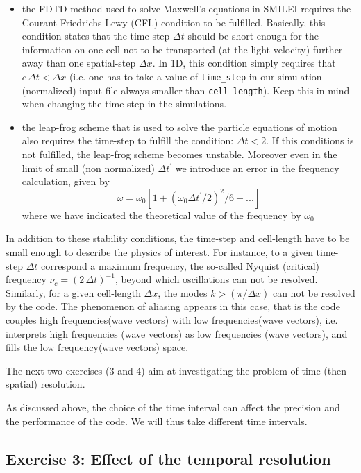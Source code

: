 \documentclass[11pt,a4paper]{article}
\begin{document}
\begin{itemize}
\item the FDTD method used to solve Maxwell's equations in SMILEI requires the Courant-Friedrichs-Lewy (CFL) condition to be fulfilled. Basically, this condition states that the time-step $\Delta t$ should be short enough for the information on one cell not to be transported (at the light velocity) further away than one spatial-step $\Delta x$. In 1D, this condition simply requires that $c\,\Delta t < \Delta x$ (i.e. one has to take a value of \texttt{time\_step} in our simulation (normalized) input file always smaller than \texttt{cell\_length}). Keep this in mind when changing the time-step in the simulations.
\item  the leap-frog scheme that is used to solve the particle equations of motion also requires the time-step to fulfill the condition: $\Delta t < 2$. If this conditions is not fulfilled, the leap-frog scheme becomes unstable.
Moreover even in the limit of small (non normalized) $\Delta t^\prime$ we introduce an error in the frequency calculation, given by 
$$\omega = \omega_0  [1+ (\omega_0 \Delta t^\prime/2 )^2/6+... ]$$
where we have indicated the theoretical value of the frequency  by $\omega_0$
\end{itemize}

In addition to these stability conditions, the time-step and cell-length have to be small enough to describe the physics of interest. For instance, to a given time-step $\Delta t$ correspond a maximum frequency, the so-called Nyquist (critical) frequency $\nu_c =(2\,\Delta t)^{-1}$, beyond which oscillations can not be resolved. Similarly, for a given cell-length $\Delta x$, the modes $k>(\pi/\Delta x)$ can not be resolved by the code.  The phenomenon of aliasing appears in this case, that is the code couples high frequencies(wave vectors)  with low frequencies(wave vectors), i.e. interprets high frequencies (wave vectors) as low frequencies (wave vectors), and fills the low frequency(wave vectors) space. 

The next two exercises (3 and 4) aim at investigating the problem of time (then spatial) resolution. 

As discussed above, the choice of the time interval can affect the precision and the performance of the code. We will thus take different time intervals. 

\subsection*{Exercise 3: Effect of the temporal resolution}
\end{document}
